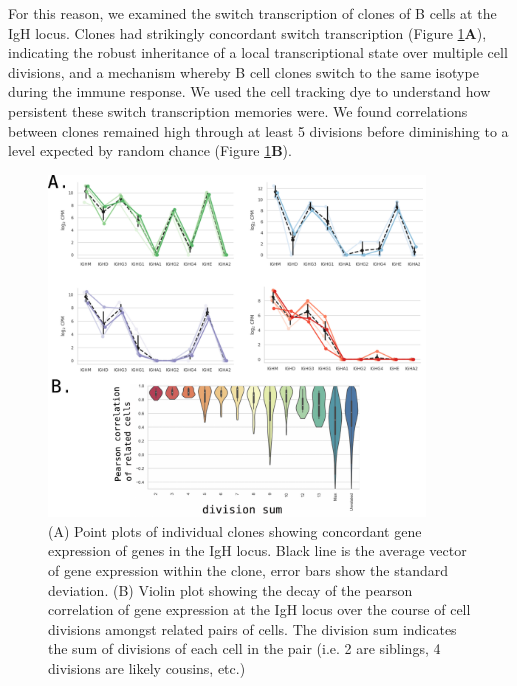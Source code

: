For this reason, we examined the switch transcription of clones of B cells at the IgH locus. Clones had strikingly concordant switch transcription  (Figure \ref{fig:paper2_Igh_concordance}\textbf{A}), indicating the robust inheritance of a local transcriptional state over multiple cell divisions, and a mechanism whereby B cell clones switch to the same isotype during the immune response. We used the cell tracking dye to understand how persistent these switch transcription memories were. We found correlations between clones remained high through at least 5 divisions before diminishing to a level expected by random chance  (Figure \ref{fig:paper2_Igh_concordance}\textbf{B}).
\begin{figure}[htb!]
\centering
\includegraphics[width=10cm, keepaspectratio]{figs/prelim_InVitro/prelim_IgH_concordance.pdf}
\caption[Concordant switch transcription states at the IgH locus between exemplary clones]{(A) Point plots of individual clones showing concordant gene expression of genes in the IgH locus. Black line is the average vector of gene expression within the clone, error bars show the standard deviation. (B) Violin plot showing the decay of the pearson correlation of gene expression at the IgH locus over the course of cell divisions amongst related pairs of cells. The division sum indicates the sum of divisions of each cell in the pair (i.e. 2 are siblings, 4 divisions are likely cousins, etc.)}
\label{fig:paper2_Igh_concordance}
\end{figure}


